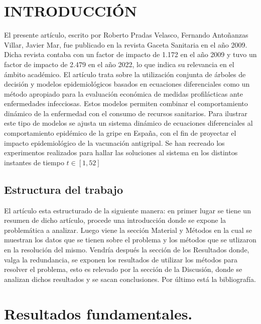 \documentclass{wscpaperproc}
\theoremstyle{wsc}
\begin{document}
\section{INTRODUCCI\'ON}
El presente art\'iculo, escrito por Roberto Pradas Velasco, Fernando Antoñanzas Villar, Javier Mar, fue publicado en la revista Gaceta Sanitaria en el año 2009. 
Dicha revista  contaba con un factor de impacto de 1.172 en el a\~no 2009 y tuvo un factor de impacto de 2.479 en el a\~no 2022, lo que indica su 
relevancia en el \'ambito acad\'emico.
El art\'iculo trata sobre la utilizaci\'on conjunta de \'arboles de decisi\'on y modelos epidemiol\'ogicos basados en ecuaciones
diferenciales como un m\'etodo apropiado para la evaluaci\'on econ\'omica de medidas profil\'acticas ante
enfermedades infecciosas. Estos modelos permiten combinar el comportamiento din\'amico de la
enfermedad con el consumo de recursos sanitarios. Para ilustrar este tipo de modelos se ajusta un sistema
din\'amico de ecuaciones diferenciales al comportamiento epid\'emico de la gripe en España, con el fin de
proyectar el impacto epidemiol\'ogico de la vacunaci\'on antigripal. Se han recreado los experimentos realizados para hallar las soluciones 
al sistema en los distintos instantes de tiempo $t \in [1,52] $
\label{sec:intro}

\subsection{Estructura del trabajo}
El art\'iculo esta estructurado de la siguiente manera: en primer lugar se tiene un resumen de dicho art\'iculo, procede una introducci\'on donde se expone la problem\'atica 
a analizar. Luego viene la secci\'on Material y M\'etodos en la cual se muestran los datos que se tienen sobre el problema y los m\'etodos que se utlizaron en la resoluci\'on 
del mismo. Vendr\'ia despu\'es la secci\'on de los Resultados donde, valga la redundancia, se exponen los resultados de utilizar los m\'etodos para resolver el problema, esto 
es relevado por la secci\'on de la Discusi\'on, donde se analizan dichos resultados y se sacan conclusiones. Por \'ultimo est\'a la bibliograf\'ia.

\section{Resultados fundamentales.}
\end{document}
